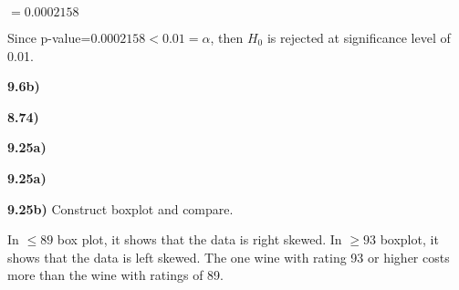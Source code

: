\documentclass{article}
\begin{document}
 $=0.0002158$
 
 Since p-value=$0.0002158<0.01=\alpha$, then $H_{0}$ is rejected at significance level of 0.01.
 
 
 
 \vspace{3mm}
 \textbf{9.6b)} 


\newpage
\textbf{8.74)}

\textbf{9.25a)}


\newpage
\textbf{9.25a)}

\textbf{9.25b)} Construct boxplot and compare.

In $\le 89$ box plot, it shows that the data is right skewed. In $ \ge 93$ boxplot, it shows that the data is left skewed. The one wine with rating 93 or higher costs more than the wine with ratings of 89. 
\end{document}
